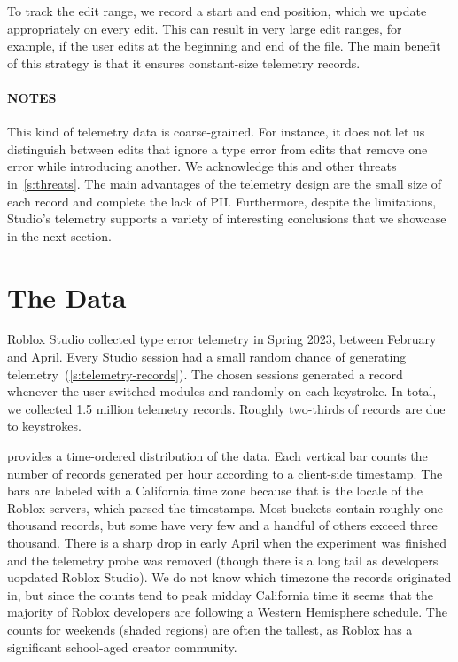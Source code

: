 \documentclass[english,submission,cleveref]{programming}
\begin{document}
To track the edit range, we record a start and end position, which we
update appropriately on every edit. This can result in very large edit
ranges, for example, if the user edits at the beginning and end of the
file.
The main benefit of this strategy is that it ensures constant-size telemetry records.

\paragraph{NOTES} %
This kind of telemetry data is coarse-grained.
For instance, it does not let us distinguish between edits that ignore a type
error from edits that remove one error while introducing another.
We acknowledge this and other threats in~\cref{s:threats}.
The main advantages of the telemetry design are the small size of each record
and complete the lack of PII.
Furthermore, despite the limitations, Studio's telemetry supports a variety of
interesting conclusions that we showcase in the next section.


\section{The Data}
\label{s:data}

Roblox Studio collected type error telemetry in Spring 2023,
between February and April.
Every Studio session had a small random chance of generating
telemetry~(\cref{s:telemetry-records}).
The chosen sessions generated a record whenever the user switched modules and
randomly on each keystroke.
In total, we collected 1.5 million telemetry records.
Roughly two-thirds of records are due to keystrokes.

 provides a time-ordered distribution of the data.
Each vertical bar counts the number of records generated per hour according to
a client-side timestamp.
The bars are labeled with a California time zone because that is the locale of
the Roblox servers, which parsed the timestamps.
Most buckets contain roughly one thousand records, but some have very few
and a handful of others exceed three thousand.
There is a sharp drop in early April when the experiment was finished
and the telemetry probe was removed (though there is a long tail as
developers uopdated Roblox Studio).
We do not know which timezone the records originated in, but since the counts
tend to peak midday California time it seems that the majority
of Roblox developers are following a Western Hemisphere schedule.
The counts for weekends (shaded regions) are often the tallest,
as Roblox has a significant school-aged creator community.
\end{document}
